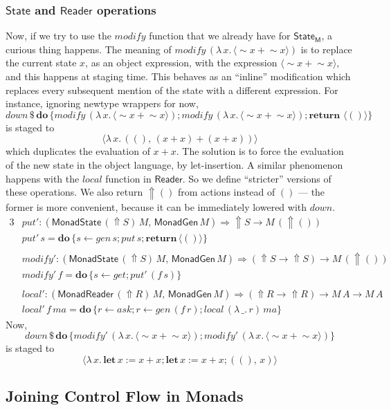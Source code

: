 \documentclass[acmsmall,screen,review,anonymous]{acmart}
\newcommand{\mit}[1]{\mathit{#1}}
\newcommand{\msf}[1]{\mathsf{#1}}
\newcommand{\mbf}[1]{\mathbf{#1}}
\newcommand{\bs}[1]{\boldsymbol{#1}}
\newcommand{\mdo}{\mbf{do}\,}
\newcommand{\return}{\mbf{return}\,}
\newcommand{\lam}{\lambda\,}
\newcommand{\M}{\msf{M}}
\newcommand{\letdef}{\mbf{let\,}}
\newcommand{\vma}{\mit{ma}}
\newcommand{\Reader}{\msf{Reader}}
\newcommand{\fro}{\leftarrow}
\newcommand{\Up}{{\Uparrow}}
\newcommand{\spl}{{\bs{\sim}}}
\newcommand{\ql}{{\bs{\langle}}}
\newcommand{\qr}{{\bs{\rangle}}}
\theoremstyle{remark}
\newcommand{\mdown}{\mit{down}}
\newcommand{\gen}{\mit{gen}}
\newcommand{\qt}[1]{\ql#1\qr}
\newcommand{\MonadGen}{\msf{MonadGen}}
\newcommand{\MonadState}{\msf{MonadState}}
\newcommand{\MonadReader}{\msf{MonadReader}}
\newcommand{\RA}{\Rightarrow}
\newcommand{\dlr}{\,\$\,}
\newcommand{\State}{\msf{State}}
\newcommand{\modify}{\mit{modify}}
\newcommand{\get}{\mit{get}}
\newcommand{\mput}{\mit{put}}
\begin{document}
\subsubsection{$\State$ and $\Reader$ operations} Now, if we try to use
the $\modify$ function that we already have for $\State_\M$, a curious thing
happens. The meaning of $\modify\,(\lam x.\,\qt{\spl x + \spl x})$ is to replace
the current state $x$, as an object expression, with the expression $\qt{\spl x
  + \spl x}$, and this happens at staging time. This behaves as an ``inline''
modification which replaces every subsequent mention of the state with a different
expression. For instance, ignoring newtype wrappers for now,
\[ \mdown \dlr \mdo \{\modify\,(\lam x.\,\qt{\spl x + \spl x}); \modify\,(\lam x.\,\qt{\spl x + \spl x});\return\,\qt{()}\} \]
is staged to
\[ \qt{\lam x.\,((),\,(x + x) + (x + x))} \]
which duplicates the evaluation of $x + x$. The solution is to force the
evaluation of the new state in the object language, by let-insertion. A similar
phenomenon happens with the $\mit{local}$ function in $\Reader$. So we define
``stricter'' versions of these operations. We also return $\Up ()$ from
actions instead of $()$ --- the former is more convenient, because it can
be immediately lowered with $\mdown$.
\begingroup
\allowdisplaybreaks
\begin{alignat*}{3}
  & \mput' : (\MonadState\,(\Up S)\,M,\,\MonadGen\,M) \RA \Up S \to M\,(\Up ()) \\
  & \mput'\,s = \mdo \{s \fro \gen\,s; \mput\,s; \return \qt{()}\}\\
  &\\
  & \modify' : (\MonadState\,(\Up S)\,M,\,\MonadGen\,M) \RA (\Up S \to \Up S) \to M\,(\Up ()) \\
  & \modify'\,f = \mdo \{s \fro \get; \mput'\,(f\,s)\}\\
  &\\
  & \mit{local'} : (\MonadReader\,(\Up R)\,M,\,\MonadGen\,M) \RA (\Up R \to \Up R) \to M\,A \to M\,A\\
  & \mit{local'}\,f\,\vma = \mdo \{r \fro \mit{ask}; r \fro \gen\,(f\,r);\mit{local}\,(\lam \_.\,r)\,\vma\}
\end{alignat*}
\endgroup
Now,
\[ \mdown \dlr \mdo \{\modify'\,(\lam x.\,\qt{\spl x + \spl x}); \modify'\,(\lam x.\,\qt{\spl x + \spl x})\} \]
is staged to
\[ \qt{\lam x.\,\letdef x := x + x; \letdef x := x + x; ((),\,x)} \]

\subsection{Joining Control Flow in Monads}\label{sec:joining-control-flow-in-monads}
\end{document}
